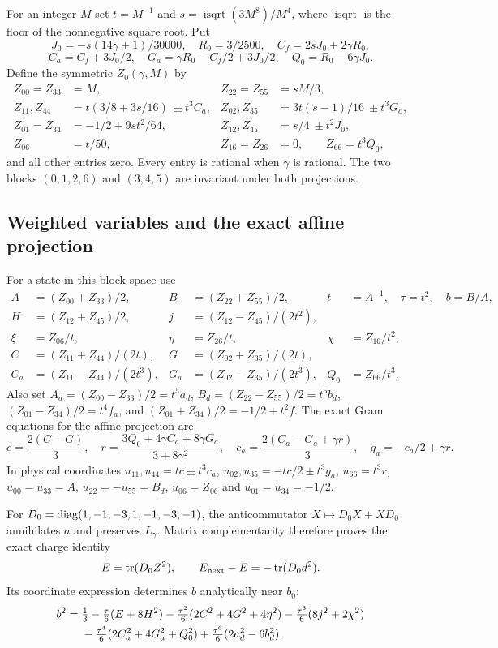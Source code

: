 \documentclass[11pt]{article}
\theoremstyle{remark}\newtheorem{remark}[theorem]{Remark}
\newcommand{\tr}{\operatorname{tr}}\newcommand{\dist}{\operatorname{dist}}
\numberwithin{equation}{section}
\begin{document}
For an integer $M$ set $t=M^{-1}$ and $s=\operatorname{isqrt}(3M^8)/M^4$, where $\operatorname{isqrt}$ is the floor of the nonnegative square root. Put
\[
 J_0=-s(14\gamma+1)/30000,\quad R_0=3/2500,\quad
 C_f=2sJ_0+2\gamma R_0,
\]
\[
 C_a=C_f+3J_0/2,\quad G_a=\gamma R_0-C_f/2+3J_0/2,\quad
 Q_0=R_0-6\gamma J_0.
\]
Define the symmetric $Z_0(\gamma,M)$ by
\begin{align*}
 Z_{00}=Z_{33}&=M,& Z_{22}=Z_{55}&=sM/3,\\
 Z_{11},Z_{44}&=t(3/8+3s/16)\ \pm t^3C_a,&
 Z_{02},Z_{35}&=3t(s-1)/16\ \pm t^3G_a,\\
 Z_{01}=Z_{34}&=-1/2+9st^2/64,&
 Z_{12},Z_{45}&=s/4\ \pm t^2J_0,\\
 Z_{06}&=t/50,& Z_{16}=Z_{26}&=0,\qquad Z_{66}=t^3Q_0,
\end{align*}
and all other entries zero. Every entry is rational when $\gamma$ is rational. The two blocks $(0,1,2,6)$ and $(3,4,5)$ are invariant under both projections.

\subsection{Weighted variables and the exact affine projection}
For a state in this block space use
\begin{align*}
 A&=(Z_{00}+Z_{33})/2,& B&=(Z_{22}+Z_{55})/2,& t&=A^{-1},\quad\tau=t^2,\quad b=B/A,\\
 H&=(Z_{12}+Z_{45})/2,& j&=(Z_{12}-Z_{45})/(2t^2),\\
 \xi&=Z_{06}/t,&\eta&=Z_{26}/t,&\chi&=Z_{16}/t^2,\\
 C&=(Z_{11}+Z_{44})/(2t),&G&=(Z_{02}+Z_{35})/(2t),\\
 C_a&=(Z_{11}-Z_{44})/(2t^3),&G_a&=(Z_{02}-Z_{35})/(2t^3),&Q_0&=Z_{66}/t^3.
\end{align*}
Also set $A_d=(Z_{00}-Z_{33})/2=t^5a_d$, $B_d=(Z_{22}-Z_{55})/2=t^5b_d$, $(Z_{01}-Z_{34})/2=t^4f_a$, and $(Z_{01}+Z_{34})/2=-1/2+t^2f$. The exact Gram equations for the affine projection are
\begin{equation}\label{eq:affinegamma}
 c=\frac{2(C-G)}3,\quad r=\frac{3Q_0+4\gamma C_a+8\gamma G_a}{3+8\gamma^2},\quad
 c_a=\frac{2(C_a-G_a+\gamma r)}3,\quad g_a=-c_a/2+\gamma r.
\end{equation}
In physical coordinates $u_{11},u_{44}=tc\pm t^3c_a$, $u_{02},u_{35}=-tc/2\pm t^3g_a$, $u_{66}=t^3r$, $u_{00}=u_{33}=A$, $u_{22}=-u_{55}=B_d$, $u_{06}=Z_{06}$ and $u_{01}=u_{34}=-1/2$.

For $D_0=\operatorname{diag}(1,-1,-3,1,-1,-3,-1)$, the anticommutator $X\mapsto D_0X+XD_0$ annihilates $a$ and preserves $L_\gamma$. Matrix complementarity therefore proves the exact charge identity
\begin{equation}\label{eq:charge}
 E=\tr(D_0Z^2),\qquad E_{\rm next}-E=-\tr(D_0d^2).
\end{equation}
Its coordinate expression determines $b$ analytically near $b_0$:
\begin{align}\label{eq:bcharge}
 b^2={}&\tfrac13-\tfrac\tau6(E+8H^2)
 -\tfrac{\tau^2}6(2C^2+4G^2+4\eta^2)
 -\tfrac{\tau^3}6(8j^2+2\chi^2)\\
 &-\tfrac{\tau^4}6(2C_a^2+4G_a^2+Q_0^2)
 +\tfrac{\tau^6}6(2a_d^2-6b_d^2).\notag
\end{align}
\end{document}
